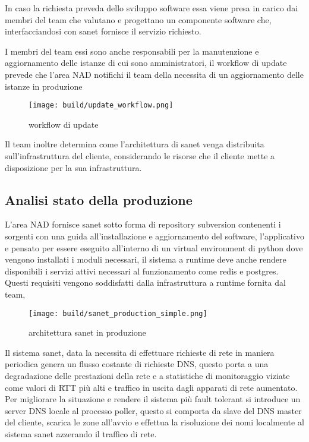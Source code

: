 In caso la richiesta preveda dello sviluppo software essa viene presa in carico dai membri del team che valutano e progettano un componente software che, interfacciandosi con sanet fornisce il servizio richiesto.

I membri del team essi sono anche responsabili per la manutenzione e aggiornamento delle istanze di cui sono amministratori, il workflow di update prevede che l'area NAD notifichi il team della necessita di un aggiornamento delle istanze in produzione


\begin{figure}[H]
    \centering
    \texttt{[image: build/update\_workflow.png]}
    \caption{workflow di update}
    \label{fig:enter-label}
\end{figure}

Il team inoltre determina come l'architettura di sanet venga distribuita sull'infrastruttura del cliente, considerando le risorse che il cliente mette a disposizione per la sua infrastruttura.

\subsection{Analisi stato della produzione}

L'area NAD fornisce sanet sotto forma di repository subversion contenenti i sorgenti con una guida all'installazione e aggiornamento del software, l'applicativo e pensato per essere eseguito all'interno di un virtual environment di python dove vengono installati i moduli necessari, il sistema a runtime deve anche rendere disponibili i servizi attivi necessari al funzionamento come redis e postgres. Questi requisiti vengono soddisfatti dalla infrastruttura a runtime fornita dal team,

\begin{figure}[H]
    \centering
    \texttt{[image: build/sanet\_production\_simple.png]}
    \caption{architettura sanet in produzione}
    \label{fig:enter-label}
\end{figure}

Il sistema sanet, data la necessita di effettuare richieste di rete in maniera periodica genera un flusso costante di richieste DNS, questo porta a una degradazione delle prestazioni della rete e a statistiche di monitoraggio viziate come valori di RTT più alti e traffico in uscita dagli apparati di rete aumentato. Per migliorare la situazione e rendere il sistema più fault tolerant si introduce un server DNS locale al processo poller, questo si comporta da slave del DNS master del cliente, scarica le zone all'avvio e effettua la risoluzione dei nomi localmente al sistema sanet azzerando il traffico di rete.


